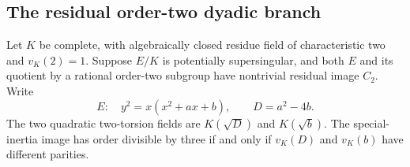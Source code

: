 \subsection{The residual order-two dyadic branch}

\begin{lemma}
\label{lem:B-RD47}
Let $K$ be complete, with algebraically closed residue field of
characteristic two and $v_K(2)=1$. Suppose $E/K$ is potentially
supersingular, and both $E$ and its quotient by a rational
order-two subgroup have nontrivial residual image $C_2$.
Write
\[
 E:\quad y^2=x(x^2+a x+b),\qquad D=a^2-4b.
\]
The two quadratic two-torsion fields are $K(\sqrt D)$ and
$K(\sqrt b)$. The special-inertia image has order divisible by
three if and only if $v_K(D)$ and $v_K(b)$ have different parities.
\end{lemma}
